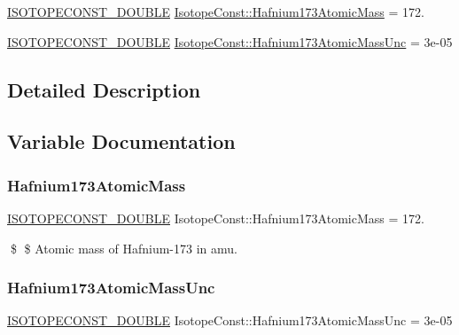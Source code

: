 \begin{DoxyCompactItemize}
\item 
\mbox{\hyperlink{group___isotope_const-_macros_ga8f45a7272ce02c0b4c65c44636ed719a}{I\+S\+O\+T\+O\+P\+E\+C\+O\+N\+S\+T\+\_\+\+D\+O\+U\+B\+LE}} \mbox{\hyperlink{group___isotope_const-_hafnium-_hf173_ga2f14f634addcb036f5d19df2869e2dcc}{Isotope\+Const\+::\+Hafnium173\+Atomic\+Mass}} = 172.
\item 
\mbox{\hyperlink{group___isotope_const-_macros_ga8f45a7272ce02c0b4c65c44636ed719a}{I\+S\+O\+T\+O\+P\+E\+C\+O\+N\+S\+T\+\_\+\+D\+O\+U\+B\+LE}} \mbox{\hyperlink{group___isotope_const-_hafnium-_hf173_ga1b3fa18fff0a5a2b71f7b714650553b9}{Isotope\+Const\+::\+Hafnium173\+Atomic\+Mass\+Unc}} = 3e-\/05
\end{DoxyCompactItemize}


\subsection{Detailed Description}


\subsection{Variable Documentation}
\mbox{\label{group___isotope_const-_hafnium-_hf173_ga2f14f634addcb036f5d19df2869e2dcc}} 
\subsubsection{\texorpdfstring{Hafnium173\+Atomic\+Mass}{Hafnium173AtomicMass}}
{\footnotesize\ttfamily \mbox{\hyperlink{group___isotope_const-_macros_ga8f45a7272ce02c0b4c65c44636ed719a}{I\+S\+O\+T\+O\+P\+E\+C\+O\+N\+S\+T\+\_\+\+D\+O\+U\+B\+LE}} Isotope\+Const\+::\+Hafnium173\+Atomic\+Mass = 172.}

\$ \$ Atomic mass of Hafnium-\/173 in amu. \mbox{\label{group___isotope_const-_hafnium-_hf173_ga1b3fa18fff0a5a2b71f7b714650553b9}} 
\subsubsection{\texorpdfstring{Hafnium173\+Atomic\+Mass\+Unc}{Hafnium173AtomicMassUnc}}
{\footnotesize\ttfamily \mbox{\hyperlink{group___isotope_const-_macros_ga8f45a7272ce02c0b4c65c44636ed719a}{I\+S\+O\+T\+O\+P\+E\+C\+O\+N\+S\+T\+\_\+\+D\+O\+U\+B\+LE}} Isotope\+Const\+::\+Hafnium173\+Atomic\+Mass\+Unc = 3e-\/05}

